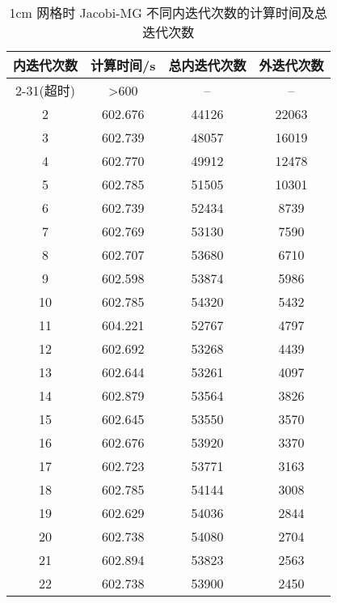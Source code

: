 \begin{datasheet}
\begin{table}
\centering
\caption{1cm 网格时 Jacobi-MG 不同内迭代次数的计算时间及总迭代次数}
\label{tab:equsolve.iter.jacobi-mg.1cm}
\begin{tabular}{cccc}
\toprule
内迭代次数 & 计算时间/s & 总内迭代次数 & 外迭代次数\\
\midrule
2-31(超时) & >600 & -- & -- \\ %
2 & 602.676 & 44126 & 22063 \\ %
3 & 602.739 & 48057 & 16019 \\ %
4 & 602.770 & 49912 & 12478 \\ %
5 & 602.785 & 51505 & 10301 \\ %
6 & 602.739 & 52434 & 8739 \\ %
7 & 602.769 & 53130 & 7590 \\ %
8 & 602.707 & 53680 & 6710 \\ %
9 & 602.598 & 53874 & 5986 \\ %
10 & 602.785 & 54320 & 5432 \\ %
11 & 604.221 & 52767 & 4797 \\ %
12 & 602.692 & 53268 & 4439 \\ %
13 & 602.644 & 53261 & 4097 \\ %
14 & 602.879 & 53564 & 3826 \\ %
15 & 602.645 & 53550 & 3570 \\ %
16 & 602.676 & 53920 & 3370 \\ %
17 & 602.723 & 53771 & 3163 \\ %
18 & 602.785 & 54144 & 3008 \\ %
19 & 602.629 & 54036 & 2844 \\ %
20 & 602.738 & 54080 & 2704 \\ %
21 & 602.894 & 53823 & 2563 \\ %
22 & 602.738 & 53900 & 2450 \\ %

\end{tabular}
\end{table}
\end{datasheet}
